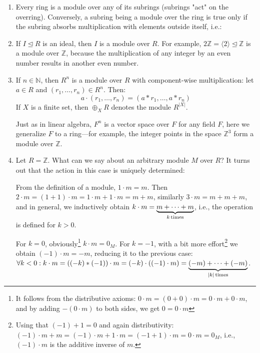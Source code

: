 \documentclass{article}
\newif\ifusemulticols
\theoremstyle{definition}
\theoremstyle{remark}
\theoremstyle{plain}
\theoremstyle{plain}
\newenvironment{mymulticols}
    { \ifusemulticols \begin{multicols}{2} \fi }
    { \ifusemulticols \end{multicols} \fi }
\newcommand{\N}{\mathbb{N}}
\newcommand{\Z}{\mathbb{Z}}
\begin{document}
\begin{mymulticols}
\begin{enumerate}
    \item Every ring is a module over any of its subrings (subrings "act" on the overring).
        Conversely, a subring being a module over the ring is true only if the subring absorbs
        multiplication with elements outside itself, i.e.:

    \item If $I \trianglelefteq R$ is an ideal, then $I$ is a module over $R$. For example, $2\Z =
        {\langle2\rangle\trianglelefteq\Z}$ is a module over $\Z$, because the multiplication of any
        integer by an even number results in another even number.

    \item If $n \in \N$, then $R^n$ is a module over $R$ with component-wise multiplication: let $a
        \in R$ and $(r_1, \dots, r_n) \in R^n$. Then: $$a\cdot(r_1,\dots,r_n) = (a * r_1, \dots, a *
        r_n)$$ If $X$ is a finite set, then $\oplus_{X} R$ denotes the module $R^{|X|}$.

        Just as in linear algebra, $F^n$ is a vector space over $F$ for any field $F$, here we
        generalize $F$ to a ring—for example, the integer points in the space $\Z^3$ form a module over $\Z$.

    \item Let $R = \Z$. What can we say about an arbitrary module $M$ over $R$?
        It turns out that the action in this case is uniquely determined:

        From the definition of a module, $1 \cdot m = m$. Then $2 \cdot m = (1 + 1) \cdot m = 1
        \cdot m + 1 \cdot m = m + m$, similarly $3 \cdot m = m + m + m$, and in general, we
        inductively obtain $k \cdot m = \underbrace{m + \cdots + m}_{k\,\textnormal{times}}$, i.e.,
        the operation is defined for $k > 0$.

        For $k = 0$, obviously\footnote{It follows from the distributive axioms: $0 \cdot m = (0 +
        0) \cdot m = 0 \cdot m + 0 \cdot m$, and by adding $-(0 \cdot m)$ to both sides, we get $0 =
        0 \cdot m$} $k \cdot m = 0_M$. For $k = -1$, with a bit more effort\footnote{Using that
        $(-1) + 1 = 0$ and again distributivity: $(-1) \cdot m + m = (-1) \cdot m + 1 \cdot m = (-1
        + 1) \cdot m = 0 \cdot m = 0_M$, i.e., $(-1) \cdot m$ is the additive inverse of $m$.} we
        obtain $(-1) \cdot m = -m$, reducing it to the previous case: $\forall k < 0 : k \cdot m =
        \left((-k) * (-1)\right) \cdot m = (-k) \cdot \left((-1)\cdot m\right) = \underbrace{(-m) +
        \cdots + (-m)}_{|k|\,\textnormal{times}}$.


\end{enumerate}
\end{mymulticols}
\end{document}
